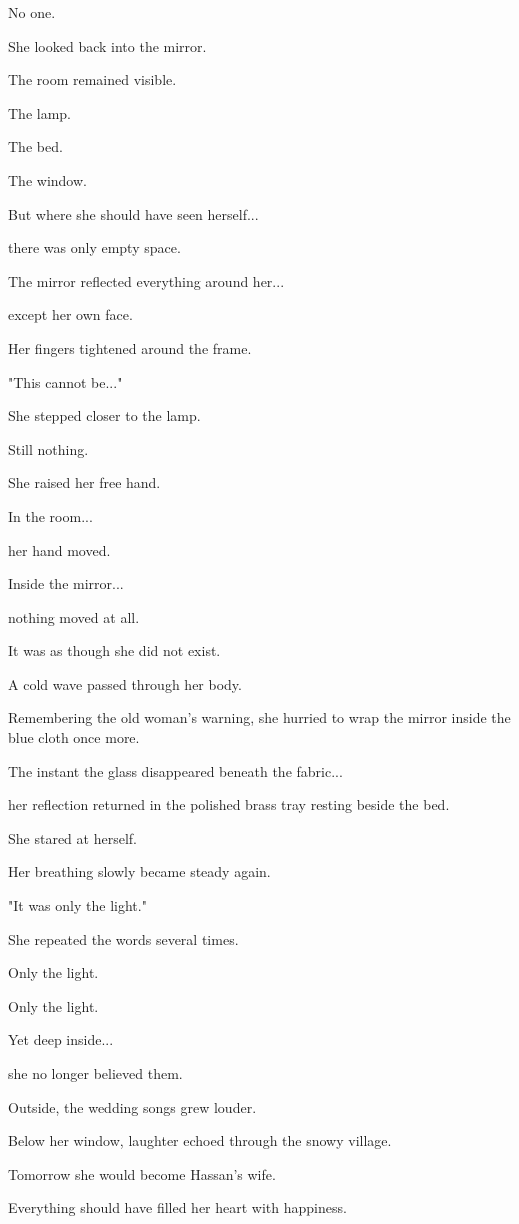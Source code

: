 \documentclass[12pt,openany]{book}
\begin{document}
No one.

She looked back into the mirror.

The room remained visible.

The lamp.

The bed.

The window.

But where she should have seen herself...

there was only empty space.

The mirror reflected everything around her...

except her own face.

Her fingers tightened around the frame.

"This cannot be..."

She stepped closer to the lamp.

Still nothing.

She raised her free hand.

In the room...

her hand moved.

Inside the mirror...

nothing moved at all.

It was as though she did not exist.

A cold wave passed through her body.

Remembering the old woman's warning, she hurried to wrap the mirror inside the blue cloth once more.

The instant the glass disappeared beneath the fabric...

her reflection returned in the polished brass tray resting beside the bed.

She stared at herself.

Her breathing slowly became steady again.

"It was only the light."

She repeated the words several times.

Only the light.

Only the light.

Yet deep inside...

she no longer believed them.

Outside, the wedding songs grew louder.

Below her window, laughter echoed through the snowy village.

Tomorrow she would become Hassan's wife.

Everything should have filled her heart with happiness.
\end{document}
